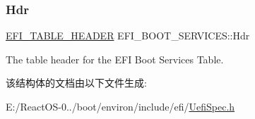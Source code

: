 \subsubsection{\texorpdfstring{Hdr}{Hdr}}
{\footnotesize\ttfamily \hyperlink{struct_e_f_i___t_a_b_l_e___h_e_a_d_e_r}{E\+F\+I\+\_\+\+T\+A\+B\+L\+E\+\_\+\+H\+E\+A\+D\+ER} E\+F\+I\+\_\+\+B\+O\+O\+T\+\_\+\+S\+E\+R\+V\+I\+C\+E\+S\+::\+Hdr}

The table header for the E\+FI Boot Services Table. 

该结构体的文档由以下文件生成\+:\begin{DoxyCompactItemize}
\item 
E\+:/\+React\+O\+S-\/0../boot/environ/include/efi/\hyperlink{_uefi_spec_8h}{Uefi\+Spec.\+h}\end{DoxyCompactItemize}

